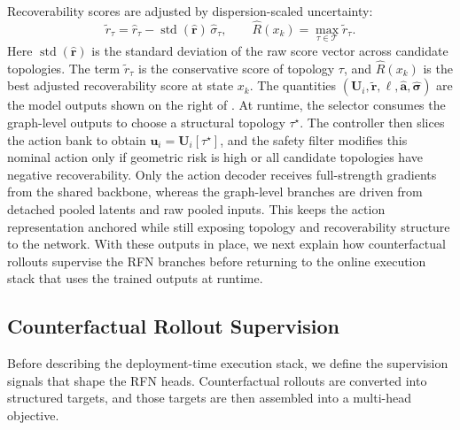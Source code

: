 \documentclass{ieeeaccess}
\newcommand{\cT}{\mathcal{T}}
\newcommand{\bfu}{\mathbf{u}}
\begin{document}
Recoverability scores are adjusted by dispersion-scaled uncertainty:
\begin{equation}
\tilde{r}_\tau = \hat{r}_\tau - \operatorname{std}(\hat{\mathbf{r}})\,\hat{\sigma}_{\tau},\qquad
\hat{R}(x_k) = \max_{\tau \in \cT} \tilde{r}_\tau .
\label{eq:adjusted_recover}
\end{equation}
Here $\operatorname{std}(\hat{\mathbf{r}})$ is the standard deviation of
the raw score vector across candidate topologies. The term
$\tilde{r}_\tau$ is the conservative score of topology $\tau$, and
$\hat{R}(x_k)$ is the best adjusted recoverability score at state
$x_k$. The quantities
$(\mathbf{U}_i,\tilde{\mathbf{r}},\bm{\ell},\hat{\mathbf{a}},
\hat{\bm{\sigma}})$ are the model outputs shown on the right of
. At runtime, the selector consumes the graph-level outputs
to choose a structural topology $\tau^\star$. The controller then slices
the action bank to obtain $\bfu_i=\mathbf{U}_i[\tau^\star]$, and the
safety filter modifies this nominal action only if geometric risk is high or
all candidate topologies have negative recoverability. Only the action
decoder receives full-strength gradients from the shared backbone,
whereas the graph-level branches are driven from detached pooled latents
and raw pooled inputs. This keeps the action representation anchored
while still exposing topology and recoverability structure to the
network. With these outputs in place, we next explain how counterfactual
rollouts supervise the RFN branches before returning to the online
execution stack that uses the trained outputs at runtime.

\subsection{Counterfactual Rollout Supervision}
\label{sec:training}

Before describing the deployment-time execution stack, we define the
supervision signals that shape the RFN heads. Counterfactual rollouts
are converted into structured targets, and those targets are then
assembled into a multi-head objective.
\end{document}
